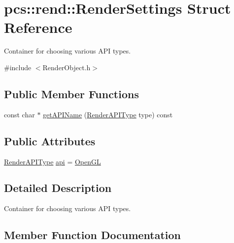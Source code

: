 \hypertarget{structpcs_1_1rend_1_1RenderSettings}{}\section{pcs\+:\+:rend\+:\+:Render\+Settings Struct Reference}
\label{structpcs_1_1rend_1_1RenderSettings}


Container for choosing various A\+PI types.  




{\ttfamily \#include $<$Render\+Object.\+h$>$}

\subsection*{Public Member Functions}
\begin{DoxyCompactItemize}
\item 
const char $\ast$ \hyperlink{structpcs_1_1rend_1_1RenderSettings_acb1a74d9eb282c46471576a5ddaa8c31}{get\+A\+P\+I\+Name} (\hyperlink{namespacepcs_1_1rend_a9627be55d9b373e41fd62c11e118e68f}{Render\+A\+P\+I\+Type} type) const
\end{DoxyCompactItemize}
\subsection*{Public Attributes}
\begin{DoxyCompactItemize}
\item 
\hyperlink{namespacepcs_1_1rend_a9627be55d9b373e41fd62c11e118e68f}{Render\+A\+P\+I\+Type} \hyperlink{structpcs_1_1rend_1_1RenderSettings_a62f0625f562fa1c6a4f7be8c783931f5}{api} = \hyperlink{namespacepcs_1_1rend_a9627be55d9b373e41fd62c11e118e68fab356921baf7069b879f7bab06b3ae51e}{Open\+GL}
\end{DoxyCompactItemize}


\subsection{Detailed Description}
Container for choosing various A\+PI types. 

\subsection{Member Function Documentation}
\mbox{\label{structpcs_1_1rend_1_1RenderSettings_acb1a74d9eb282c46471576a5ddaa8c31}} 
